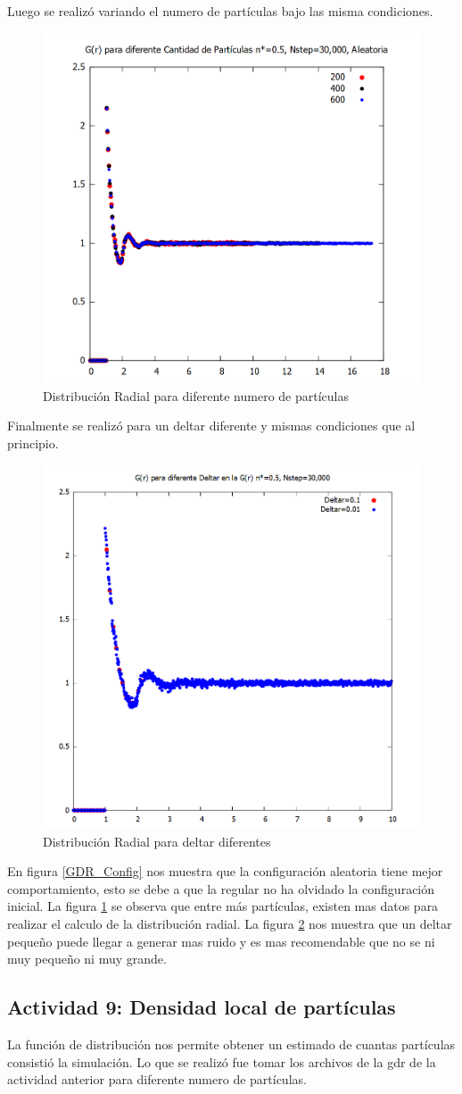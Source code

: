 \documentclass[12pt,letterpaper]{article}
\begin{document}
Luego se realizó variando el numero de partículas bajo las misma condiciones.

\begin{figure}[H]
	\centering
	\includegraphics[width=0.50\linewidth]{gdrPart.png}
	\caption{Distribución Radial para diferente numero de partículas}
	\label{GDR_Particulas}
\end{figure}

Finalmente se realizó para un deltar diferente y mismas condiciones que al principio.

\begin{figure}[H]
	\centering
	\includegraphics[width=0.50\linewidth]{gdrDeltar.png}
	\caption{Distribución Radial para deltar diferentes}
	\label{GDR_Deltar}
\end{figure}
 En figura \ref{GDR_Config} nos muestra que la configuración aleatoria tiene mejor comportamiento, esto se debe a que la regular no ha olvidado la configuración inicial. La figura \ref{GDR_Particulas} se observa que entre más partículas, existen mas datos para realizar el calculo de la distribución radial. La figura \ref{GDR_Deltar} nos muestra que un deltar pequeño puede llegar a generar mas ruido y es mas recomendable que no se ni muy pequeño ni muy grande.
 
 \subsection*{Actividad 9: Densidad	local de partículas}
La función de distribución nos permite obtener un estimado de cuantas partículas consistió la simulación. Lo que se realizó fue tomar los archivos de la gdr de la actividad anterior para diferente numero de partículas.
\end{document}
